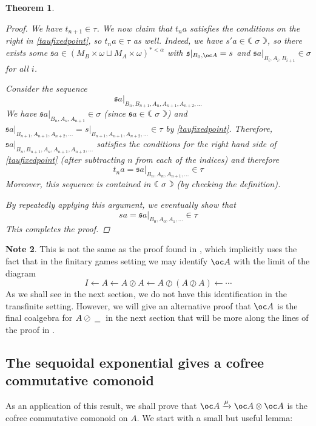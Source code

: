\documentclass[11pt]{article} %
\theoremstyle{plain} %
\newtheorem{theorem}{Theorem}[section]
\theoremstyle{definition} %
\theoremstyle{note}
\newtheorem{note}[theorem]{Note}
\theoremstyle{exercisestyle}
\newcommand{\tensor}{\otimes}
\newcommand{\sequoid}{\oslash}
\newcommand{\cprd}{\sqcup}
\newcommand{\s}{\mathfrak s}
\newcommand{\blank}{\;\underline{\hspace{1.5ex}}\;}
\newcommand{\fcoal}[1]{{\leftmoon #1 \rightmoon}}
\begin{document}
\begin{theorem}
\begin{proof}
    We have $t_{n+1}\in\tau$.  We now claim that $t_{n}a$ satisfies the conditions on the right in \eqref{taufixedpoint}, so $t_n a\in\tau$ as well.  Indeed, we have $s'a\in\fcoal\sigma$, so there exists some $\s a\in(M_B\times\omega\cprd M_A\times\omega)^{*<\alpha}$ with $\s\vert_{B_0,\oc A}=s$ and $\s a\vert_{B_i,A_i,B_{i+1}}\in\sigma$ for all $i$.  

    Consider the sequence
    \[
      \s a\vert_{B_n,B_{n+1},A_n,A_{n+1},A_{n+2},\dots}
      \]
    We have $\s a\vert_{B_n,A_n,A_{n+1}}\in\sigma$ (since $\s a\in\fcoal\sigma$) and $\s a\vert_{B_{n+1},A_{n+1},A_{n+2},\dots}=s \vert_{B_{n+1},A_{n+1},A_{n+2},\dots}\in\tau$ by \eqref{taufixedpoint}.  Therefore, $\s a\vert_{B_n,B_{n+1},A_n,A_{n+1},A_{n+2},\dots}$ satisfies the conditions for the right hand side of \eqref{taufixedpoint} (after subtracting $n$ from each of the indices) and therefore 
    \[
      t_n a=\s a\vert_{B_n,A_n,A_{n+1},\dots}\in\tau
      \]
    Moreover, this sequence is contained in $\fcoal\sigma$ (by checking the definition).

    By repeatedly applying this argument, we eventually show that 
    \[
      sa=\s a\vert_{B_0,A_0,A_1,\dots}\in\tau
      \]
    This completes the proof.
  \end{proof}
\end{theorem}

\begin{note}
  This is not the same as the proof found in \cite{martinsthesis}, which implicitly uses the fact that in the finitary games setting we may identify $\oc A$ with the limit of the diagram
  \[
    I \leftarrow A \leftarrow A\sequoid A \leftarrow A\sequoid(A\sequoid A) \leftarrow \cdots
    \]
  As we shall see in the next section, we do not have this identification in the transfinite setting.  However, we will give an alternative proof that $\oc A$ is the final coalgebra for $A\sequoid\blank$ in the next section that will be more along the lines of the proof in \cite{martinsthesis}.  
\end{note}

\pagebreak

\subsection{The sequoidal exponential gives a cofree commutative comonoid}
\label{SeqExpIsCofCommCom}

As an application of this result, we shall prove that $\oc A\xrightarrow{\mu}\oc A\tensor \oc A$ is the cofree commutative comonoid on $A$.  We start with a small but useful lemma:
\end{document}
